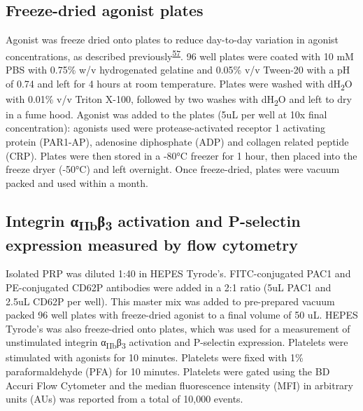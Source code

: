 \documentclass[11pt,twoside]{bristolthesis}
\begin{document}
\hypertarget{freeze-dried-agonist-plates}{%
\subsection{Freeze-dried agonist plates}\label{freeze-dried-agonist-plates}}

Agonist was freeze dried onto plates to reduce day-to-day variation in agonist concentrations, as described previously\textsuperscript{\protect\hyperlink{ref-Chan2018}{57}}. 96 well plates were coated with 10 mM PBS with 0.75\% w/v hydrogenated gelatine and 0.05\% v/v Tween-20 with a pH of 0.74 and left for 4 hours at room temperature. Plates were washed with dH\textsubscript{2}O with 0.01\% v/v Triton X-100, followed by two washes with dH\textsubscript{2}O and left to dry in a fume hood. Agonist was added to the plates (5uL per well at 10x final concentration): agonists used were protease-activated receptor 1 activating protein (PAR1-AP), adenosine diphosphate (ADP) and collagen related peptide (CRP). Plates were then stored in a -80°C freezer for 1 hour, then placed into the freeze dryer (-50°C) and left overnight. Once freeze-dried, plates were vacuum packed and used within a month.

\hypertarget{integrin-ux3b1iibux3b23-activation-and-p-selectin-expression-measured-by-flow-cytometry}{%
\subsection{\texorpdfstring{Integrin α\textsubscript{IIb}β\textsubscript{3} activation and P-selectin expression measured by flow cytometry}{Integrin αIIbβ3 activation and P-selectin expression measured by flow cytometry}}\label{integrin-ux3b1iibux3b23-activation-and-p-selectin-expression-measured-by-flow-cytometry}}

Isolated PRP was diluted 1:40 in HEPES Tyrode's. FITC-conjugated PAC1 and PE-conjugated CD62P antibodies were added in a 2:1 ratio (5uL PAC1 and 2.5uL CD62P per well). This master mix was added to pre-prepared vacuum packed 96 well plates with freeze-dried agonist to a final volume of 50 uL. HEPES Tyrode's was also freeze-dried onto plates, which was used for a measurement of unstimulated integrin α\textsubscript{IIb}β\textsubscript{3} activation and P-selectin expression. Platelets were stimulated with agonists for 10 minutes. Platelets were fixed with 1\% paraformaldehyde (PFA) for 10 minutes. Platelets were gated using the BD Accuri Flow Cytometer and the median fluorescence intensity (MFI) in arbitrary units (AUs) was reported from a total of 10,000 events.
\end{document}
